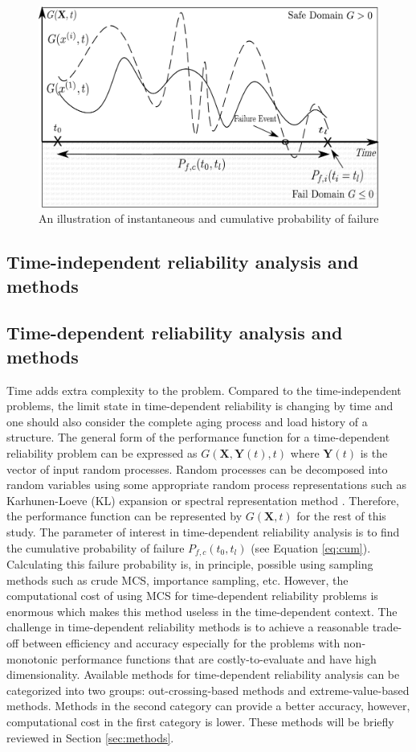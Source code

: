 \begin{figure}[hbt!]
\centering
  \includegraphics[width=0.75\linewidth]{figures/fig-ch2/performanceink.pdf}
  \caption{An illustration of instantaneous and cumulative probability of failure}
  \label{fig:cum-inst}
\end{figure}


\subsection{Time-independent reliability analysis and methods}
\subsection{Time-dependent reliability analysis and methods}


\noindent
Time adds extra complexity to the problem. Compared to the time-independent problems, the limit state in time-dependent reliability is changing by time and one should 
also consider the complete aging process and load history of a structure. The general form of the performance function for a time-dependent reliability problem can be 
expressed as $G(\textbf{X},\textbf{Y}(t),t)$ where $\textbf{Y}(t)$ is the vector of input random processes. Random processes can be decomposed into random variables
using some appropriate random process representations such as Karhunen-Loeve (KL) expansion \citep{Loeve1977} or spectral representation method \citep{Chun1993}. 
Therefore, the performance function can be represented by $G(\textbf{X},t)$ for the rest of this study. The parameter of interest in time-dependent reliability 
analysis is to find the cumulative probability of failure $P_{f,c}(t_0,t_l)$ (see Equation \ref{eq:cum}). Calculating this failure probability is, in principle, 
possible using sampling methods such as crude MCS, importance sampling, etc. However, the computational cost of using MCS for time-dependent reliability problems is 
enormous which makes this method useless in 
the time-dependent context. The challenge in time-dependent reliability methods is to achieve a reasonable trade-off between efficiency and accuracy especially for the 
problems with non-monotonic performance functions that are costly-to-evaluate and have high dimensionality. Available methods for time-dependent reliability analysis 
can be categorized into two groups: out-crossing-based methods and extreme-value-based methods. Methods in the second category can provide a better accuracy, however, 
computational cost in the first category is lower. These methods will be briefly reviewed in Section \ref{sec:methods}. 


